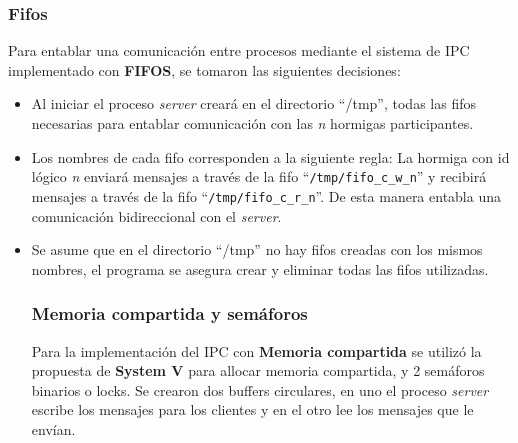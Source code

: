 \documentclass[a4paper,10pt]{article}
\begin{document}
\subsubsection{Fifos}
Para entablar una comunicación entre procesos mediante el sistema de IPC implementado con \textbf{FIFOS}, se tomaron las siguientes decisiones:
\begin{itemize}
 \item Al iniciar el proceso \textit{server} creará en el directorio ``/tmp'', todas las fifos necesarias para entablar comunicación 
con las \textit{n} hormigas participantes.
 \item Los nombres de cada fifo corresponden a la siguiente regla: La hormiga con id lógico \textit{n} enviará mensajes a través de la fifo 
``\verb|/tmp/fifo_c_w_n|'' y recibirá mensajes a través de la fifo ``\verb|/tmp/fifo_c_r_n|''. De esta manera entabla una comunicación
bidireccional con el \textit{server}.
  \item Se asume que en el directorio ``/tmp'' no hay fifos creadas con los mismos nombres, el programa se asegura crear y eliminar todas las 
fifos utilizadas.

\subsubsection{Memoria compartida y semáforos}
Para la implementación del IPC con \textbf{Memoria compartida} se utilizó la propuesta de \textbf{System V} para allocar memoria compartida, y 
2 semáforos binarios o locks.
Se crearon dos buffers circulares, en uno el proceso \textit{server} escribe los mensajes para los clientes y en el otro lee los mensajes que
le envían. 
\end{itemize}






\bigskip
\end{document}
